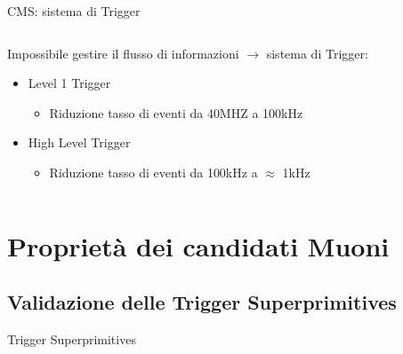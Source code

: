 \documentclass{beamer}
\begin{document}
\begin{frame}{CMS: sistema di Trigger}

\begin{columns}
    \begin{column}{0.5\textwidth}
        Impossibile gestire il flusso di informazioni $\rightarrow$ sistema di Trigger:
        \begin{itemize}
            \item Level 1 Trigger
            \begin{itemize}
                \item Riduzione tasso di eventi da 40MHZ a 100kHz
            \end{itemize}
            \item High Level Trigger
            \begin{itemize}
                \item Riduzione tasso di eventi da 100kHz a $\approx$ 1kHz
            \end{itemize}
        \end{itemize}

    \end{column}

    \begin{column}{0.5\textwidth}
        \centering
        \vspace{0.2cm}
    \end{column}
\end{columns}

\end{frame}


\section{Proprietà dei candidati Muoni}
\subsection{Validazione delle Trigger  Superprimitives}

\begin{frame}{Trigger Superprimitives}


\begin{columns}

    \begin{column}{0.5\textwidth}
     \centering
    \end{column}


    \begin{column}{0.5\textwidth}
        \centering
    \end{column}
\end{columns}

    
\end{frame}



    
    
\end{document}
